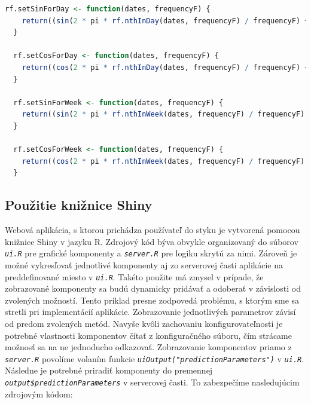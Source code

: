 \documentclass[a4paper,slovak,12pt,appendix]{article}
\begin{document}
\begin{lstlisting}[language=R]
  rf.setSinForDay <- function(dates, frequencyF) {
    return((sin(2 * pi * rf.nthInDay(dates, frequencyF) / frequencyF) + 1) / 2)
  }

  rf.setCosForDay <- function(dates, frequencyF) {
    return((cos(2 * pi * rf.nthInDay(dates, frequencyF) / frequencyF) + 1) / 2)
  }

  rf.setSinForWeek <- function(dates, frequencyF) {
    return((sin(2 * pi * rf.nthInWeek(dates, frequencyF) / frequencyF) + 1) / 2)
  }

  rf.setCosForWeek <- function(dates, frequencyF) {
    return((cos(2 * pi * rf.nthInWeek(dates, frequencyF) / frequencyF) + 1) / 2)
  }
\end{lstlisting}


\subsection{Použitie knižnice Shiny}
Webová aplikácia, s ktorou prichádza používateľ do styku je vytvorená pomocou
knižnice Shiny v jazyku R. Zdrojový kód býva obvykle organizovaný do súborov
\texttt{\textit{ui.R}} pre grafické komponenty a \texttt{\textit{server.R}} pre logiku skrytú za nimi.
Zároveň je možné vykresľovať jednotlivé komponenty aj zo serverovej časti
aplikácie na preddefinované miesto v \texttt{\textit{ui.R}}. Takéto použite má zmysel
v prípade, že zobrazované komponenty sa budú dynamicky pridávať a odoberať
v závislosti od zvolených možností. Tento príklad presne zodpovedá problému,
s ktorým sme sa stretli pri implementácií aplikácie. Zobrazovanie jednotlivých
parametrov závisí od predom zvolených metód. Navyše kvôli zachovaniu
konfigurovateľnosti je potrebné vlastnosti komponentov čítať z konfiguračného
súboru, čím strácame možnosť sa na ne jednoducho odkazovať. Zobrazovanie
komponentov priamo z \texttt{\textit{server.R}} povolíme volaním funkcie
\texttt{\textit{uiOutput("predictionParameters")}} v \texttt{\textit{ui.R}}. Následne je potrebné priradiť
komponenty do premennej \texttt{\textit{output\$predictionParameters}} v serverovej časti.
To zabezpečíme nasledujúcim zdrojovým kódom:
\end{document}
